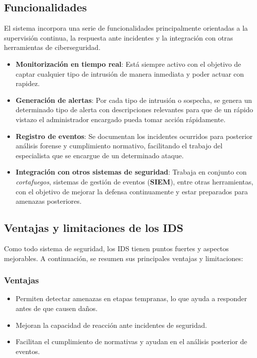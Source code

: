 \documentclass[11pt,a4paper,twoside]{report}
\begin{document}
\subsection{Funcionalidades}

El sistema incorpora una serie de funcionalidades principalmente orientadas a la supervisión continua, la respuesta ante incidentes y la integración con otras herramientas de ciberseguridad.

\begin{itemize}
	\item \textbf{Monitorización en tiempo real}: Está siempre activo con el objetivo de captar cualquier tipo de intrusión de manera inmediata y poder actuar con rapidez.
	
	\item \textbf{Generación de alertas}: Por cada tipo de intrusión o sospecha, se genera un determinado tipo de alerta con descripciones relevantes para que de un rápido vistazo el administrador encargado pueda tomar acción rápidamente.
	
	\item \textbf{Registro de eventos}: Se documentan los incidentes ocurridos para posterior análisis forense y cumplimiento normativo, facilitando el trabajo del especialista que se encargue de un determinado ataque.
	
	\item \textbf{Integración con otros sistemas de seguridad}: Trabaja en conjunto con \textit{cortafuegos}, sistemas de gestión de eventos (\textbf{SIEM}), entre otras herramientas, con el objetivo de mejorar la defensa continuamente y estar preparados para amenazas posteriores.
\end{itemize}

\subsection{Ventajas y limitaciones de los IDS}

Como todo sistema de seguridad, los IDS tienen puntos fuertes y aspectos mejorables. A continuación, se resumen sus principales ventajas y limitaciones:

\subsubsection{Ventajas}

\begin{itemize}
	\item Permiten detectar amenazas en etapas tempranas, lo que ayuda a responder antes de que causen daños.
	\item Mejoran la capacidad de reacción ante incidentes de seguridad.
	\item Facilitan el cumplimiento de normativas y ayudan en el análisis posterior de eventos.
\end{itemize}
\end{document}
